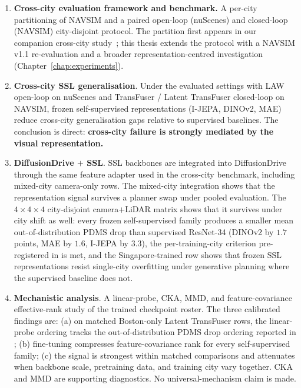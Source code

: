 \begin{enumerate}
    \item \textbf{Cross-city evaluation framework and benchmark.} A per-city partitioning of NAVSIM and a paired open-loop (nuScenes) and closed-loop (NAVSIM) city-disjoint protocol. The partition first appears in our companion cross-city study~\cite{naeinian-cross-city-2026}; this thesis extends the protocol with a NAVSIM v1.1 re-evaluation and a broader representation-centred investigation (Chapter~\ref{chap:experiments}).

    \item \textbf{Cross-city SSL generalisation}. Under the evaluated settings with LAW open-loop on nuScenes and TransFuser / Latent TransFuser closed-loop on NAVSIM, frozen self-supervised representations (I-JEPA, DINOv2, MAE) reduce cross-city generalisation gaps relative to supervised baselines. The conclusion is direct: \textbf{cross-city failure is strongly mediated by the visual representation.}

    \item \textbf{DiffusionDrive $+$ SSL}. SSL backbones are integrated into DiffusionDrive through the same feature adapter used in the cross-city benchmark, including mixed-city camera-only rows. The mixed-city integration shows that the representation signal survives a planner swap under pooled evaluation. The $4 \times 4 \times 4$ city-disjoint camera$+$LiDAR matrix shows that it survives under city shift as well: every frozen self-supervised family produces a smaller mean out-of-distribution PDMS drop than supervised ResNet-34 (DINOv2 by $1.7$ points, MAE by $1.6$, I-JEPA by $3.3$), the per-training-city criterion pre-registered in  is met, and the Singapore-trained row shows that frozen SSL representations resist single-city overfitting under generative planning where the supervised baseline does not.

    \item \textbf{Mechanistic analysis}. A linear-probe, CKA, MMD, and feature-covariance effective-rank study of the trained checkpoint roster. The three calibrated findings are: (a) on matched Boston-only Latent TransFuser rows, the linear-probe ordering tracks the out-of-distribution PDMS drop ordering reported in ; (b) fine-tuning compresses feature-covariance rank for every self-supervised family; (c) the signal is strongest within matched comparisons and attenuates when backbone scale, pretraining data, and training city vary together. CKA and MMD are supporting diagnostics. No universal-mechanism claim is made.
\end{enumerate}


